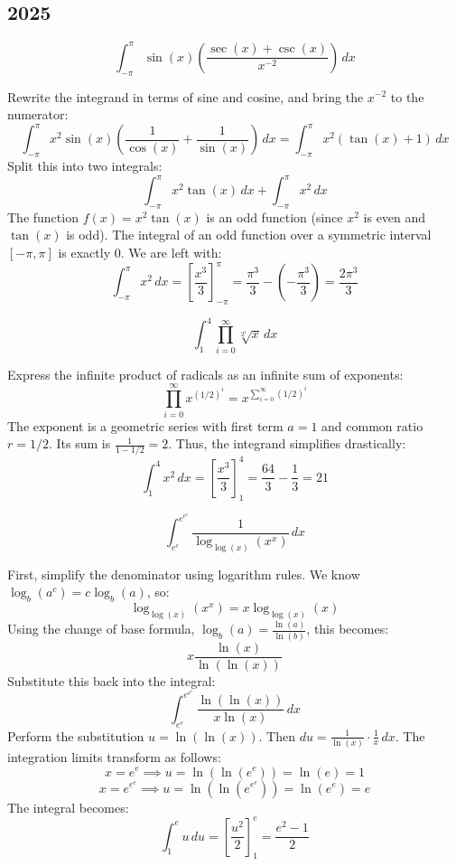\subsection*{2025}
\begin{questions}
    \question \[ \int_{-\pi}^\pi \sin(x) \left( \frac{\sec(x) + \csc(x)}{x^{-2}} \right) \,dx \]
    \begin{solution}
        Rewrite the integrand in terms of sine and cosine, and bring the $x^{-2}$ to the numerator:
        \[ \int_{-\pi}^\pi x^2 \sin(x) \left( \frac{1}{\cos(x)} + \frac{1}{\sin(x)} \right) \,dx = \int_{-\pi}^\pi x^2 (\tan(x) + 1) \,dx \]
        Split this into two integrals:
        \[ \int_{-\pi}^\pi x^2 \tan(x) \,dx + \int_{-\pi}^\pi x^2 \,dx \]
        The function $f(x) = x^2 \tan(x)$ is an odd function (since $x^2$ is even and $\tan(x)$ is odd). The integral of an odd function over a symmetric interval $[-\pi, \pi]$ is exactly $0$. We are left with:
        \[ \int_{-\pi}^\pi x^2 \,dx = \left[ \frac{x^3}{3} \right]_{-\pi}^\pi = \frac{\pi^3}{3} - \left(-\frac{\pi^3}{3}\right) = \frac{2\pi^3}{3} \]
    \end{solution}

    \question \[ \int_1^4 \prod_{i=0}^\infty \sqrt[2^i]{x} \,dx \]
    \begin{solution}
        Express the infinite product of radicals as an infinite sum of exponents:
        \[ \prod_{i=0}^\infty x^{(1/2)^i} = x^{\sum_{i=0}^\infty (1/2)^i} \]
        The exponent is a geometric series with first term $a=1$ and common ratio $r=1/2$. Its sum is $\frac{1}{1 - 1/2} = 2$. Thus, the integrand simplifies drastically:
        \[ \int_1^4 x^2 \,dx = \left[ \frac{x^3}{3} \right]_1^4 = \frac{64}{3} - \frac{1}{3} = 21 \]
    \end{solution}

    \question \[ \int_{e^e}^{e^{e^e}} \frac{1}{\log_{\log(x)}(x^x)} \,dx \]
    \begin{solution}
        First, simplify the denominator using logarithm rules. We know $\log_b(a^c) = c \log_b(a)$, so:
        \[ \log_{\log(x)}(x^x) = x \log_{\log(x)}(x) \]
        Using the change of base formula, $\log_b(a) = \frac{\ln(a)}{\ln(b)}$, this becomes:
        \[ x \frac{\ln(x)}{\ln(\ln(x))} \]
        Substitute this back into the integral:
        \[ \int_{e^e}^{e^{e^e}} \frac{\ln(\ln(x))}{x \ln(x)} \,dx \]
        Perform the substitution $u = \ln(\ln(x))$. Then $du = \frac{1}{\ln(x)} \cdot \frac{1}{x} \,dx$. The integration limits transform as follows:
        \[ x = e^e \implies u = \ln(\ln(e^e)) = \ln(e) = 1 \]
        \[ x = e^{e^e} \implies u = \ln(\ln(e^{e^e})) = \ln(e^e) = e \]
        The integral becomes:
        \[ \int_1^e u \,du = \left[ \frac{u^2}{2} \right]_1^e = \frac{e^2 - 1}{2} \]
    \end{solution}


\end{questions}
